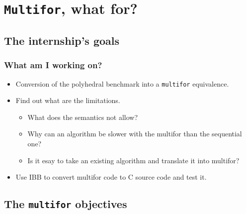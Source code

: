 \documentclass{beamer}
\begin{document}

\section{\texttt{Multifor}, what for?}

\subsection{The internship's goals}

\begin{frame}
\frametitle{What am I working on?}
\begin{itemize}

\item Conversion of the polyhedral benchmark into a \texttt{multifor} equivalence.
\item Find out what are the limitations.

\begin{itemize}

\item What does the semantics not allow?
\item Why can an algorithm be slower with the multifor than the sequential one?
\item Is it esay to take an existing algorithm and translate it into multifor?

\end{itemize}

\item Use IBB to convert multifor code to C source code and test it.

\end{itemize}
\end{frame}

\subsection{The \texttt{multifor} objectives}
\end{document}
